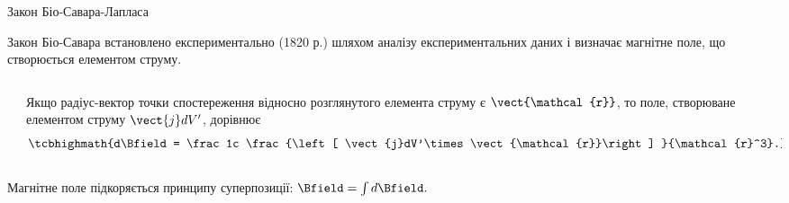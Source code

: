 \documentclass{beamer}
\begin{document}
\begin{frame}{Закон Біо-Савара-Лапласа}{}
	\begin{block}{}\justifying
		Закон Біо-Савара встановлено експериментально (1820 р.) шляхом аналізу експериментальних даних і \alert{визначає магнітне поле, що створюється
			елементом струму}.
	\end{block}
	\begin{columns}
		\begin{column}{0.4\linewidth}\centering
            
		\end{column}
		\begin{column}{0.6\linewidth}
			\begin{block}{}\justifying
				Якщо радіус-вектор точки спостереження відносно розглянутого елемента струму є $\vect{\mathcal{r}}$, то поле,
				створюване елементом струму $\vect{j} dV'$, дорівнює
				\begin{equation*}
					\tcbhighmath{d\Bfield = \frac1c \frac{\left[ \vect{j}dV'\times\vect{\mathcal{r}}\right] }{\mathcal{r}^3}.}
				\end{equation*}
			\end{block}
		\end{column}
	\end{columns}
	\begin{alertblock}{}
		Магнітне поле підкоряється принципу суперпозиції:
		\(
		\Bfield = \int d\Bfield.
		\)
	\end{alertblock}
\end{frame}
\end{document}
